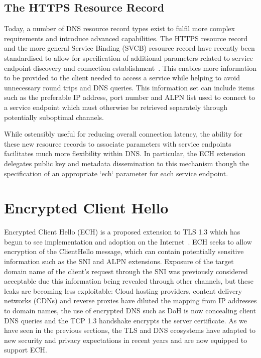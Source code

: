\subsection{The HTTPS Resource Record}

Today, a number of DNS resource record types exist to fulfil more complex requirements and introduce advanced capabilities. The HTTPS resource record and the more general Service Binding (SVCB) resource record have recently been standardised to allow for specification of additional parameters related to service endpoint discovery and connection establishment~\cite{rfc9460}. This enables more information to be provided to the client needed to access a service while helping to avoid unnecessary round trips and DNS queries. This information set can include items such as the preferable IP address, port number and ALPN list used to connect to a service endpoint which must otherwise be retrieved separately through potentially suboptimal channels.

While ostensibly useful for reducing overall connection latency, the ability for these new resource records to associate parameters with service endpoints facilitates much more flexibility within DNS. In particular, the ECH extension delegates public key and metadata dissemination to this mechanism though the specification of an appropriate `ech` parameter for each service endpoint.








\section{Encrypted Client Hello}

Encrypted Client Hello (ECH) is a proposed extension to TLS 1.3 which has begun to see implementation and adoption on the Internet~\cite{ietf-tls-esni-18, tsiatsikas2022measuring, CF-ECH}. ECH seeks to allow encryption of the ClientHello message, which can contain potentially sensitive information such as the SNI and ALPN extensions. Exposure of the target domain name of the client's request through the SNI was previously considered acceptable due this information being revealed through other channels, but these leaks are becoming less exploitable: Cloud hosting providers, content delivery networks (CDNs) and reverse proxies have diluted the mapping from IP addresses to domain names, the use of encrypted DNS such as DoH is now concealing client DNS queries and the TCP 1.3 handshake encrypts the server certificate. As we have seen in the previous sections, the TLS and DNS ecosystems have adapted to new security and privacy expectations in recent years and are now equipped to support ECH.

